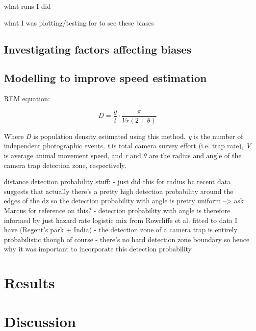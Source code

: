 \documentclass[a4paper,12pt,twoside]{report}
\begin{document}
	what runs I did
	
	what I was plotting/testing for to see these biases
	
	
	
	
	\subsection{Investigating factors affecting biases}
	
	
	
	
	\subsection{Modelling to improve speed estimation}
	

	
	
	REM equation:
	
		\begin{equation}
			D = \frac{y}{t} \cdot \frac{\pi}{Vr(2 + \theta)}
	\end{equation}
	
	Where \textit{D} is population density estimated using this method, \textit{y} is the number of independent photographic events, \textit{t} is total camera survey effort (i.e. trap rate), \textit{V} is average animal movement speed, and \textit{r} and \begin{math}\theta\end{math} are the radius and angle of the camera trap detection zone, respectively. 
	
	
	distance detection probability stuff:
	- just did this for radius bc recent data suggests that actually there's a pretty high detection probability around the edges of the dz so the detection probability with angle is pretty uniform --> ask Marcus for reference on this?
	- detection probability with angle is therefore informed by just hazard rate logistic mix from Rowcliffe et al. fitted to data I have (Regent's park + India)
	- the detection zone of a camera trap is entirely probabilistic though of course - there's no hard detection zone boundary so hence why it was important to incorporate this detection probability
	
	
	
	
	\section{Results}
	
	
	
	\newpage
	
	\section{Discussion}
	
\end{document}
